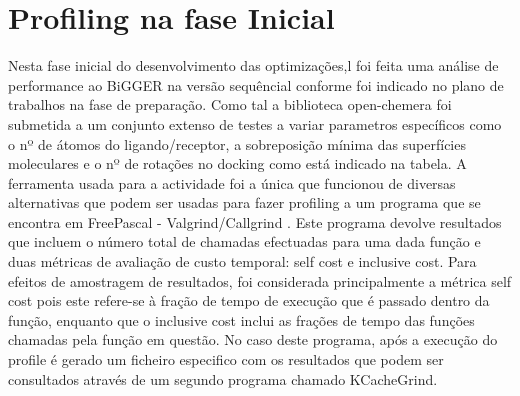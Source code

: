\section{Profiling na fase Inicial}
Nesta fase inicial do desenvolvimento das optimizações,l foi feita uma análise de performance ao BiGGER na versão sequêncial conforme foi indicado no plano de trabalhos na fase de preparação. Como tal a biblioteca open-chemera foi submetida a um conjunto extenso de testes a variar parametros específicos como o nº de átomos do ligando/receptor, a sobreposição mínima das superfícies moleculares e o nº de rotações no docking como está indicado na tabela. A ferramenta usada para a actividade foi a única que funcionou de diversas alternativas que podem ser usadas para fazer profiling a um programa que se encontra em FreePascal - Valgrind/Callgrind \cite{lazProf}. Este programa devolve resultados que incluem o número total de chamadas efectuadas para uma dada função e duas métricas de avaliação de custo temporal: self cost e inclusive cost. Para efeitos de amostragem de resultados, foi considerada principalmente a métrica self cost pois este refere-se à fração de tempo de execução que é passado dentro da função, enquanto que o inclusive cost inclui as frações de tempo das funções chamadas pela função em questão. No caso deste programa, após a execução do profile é gerado um ficheiro especifico com os resultados que podem ser consultados através de um segundo programa chamado KCacheGrind.
